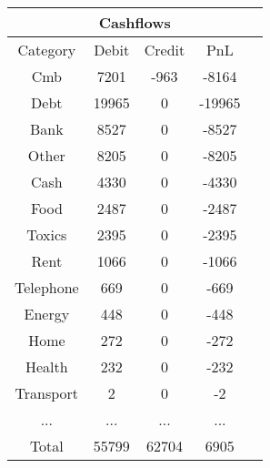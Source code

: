 \begin{longtable}{|c|c|c|c|c|}
\hline
\multicolumn{5}{|c|}{Cashflows} \\
\hline
Category & Debit & Credit & PnL \\
\hline
Cmb & 7201 & -963 & -8164\\
\hline
Debt & 19965 & 0 & -19965\\
\hline
Bank & 8527 & 0 & -8527\\
\hline
Other & 8205 & 0 & -8205\\
\hline
Cash & 4330 & 0 & -4330\\
\hline
Food & 2487 & 0 & -2487\\
\hline
Toxics & 2395 & 0 & -2395\\
\hline
Rent & 1066 & 0 & -1066\\
\hline
Telephone & 669 & 0 & -669\\
\hline
Energy & 448 & 0 & -448\\
\hline
Home & 272 & 0 & -272\\
\hline
Health & 232 & 0 & -232\\
\hline
Transport & 2 & 0 & -2\\
\hline
 ... & ... & ... & ...\\
\hline
 Total & 55799 & 62704 & 6905 \\
\hline
\end{longtable}
